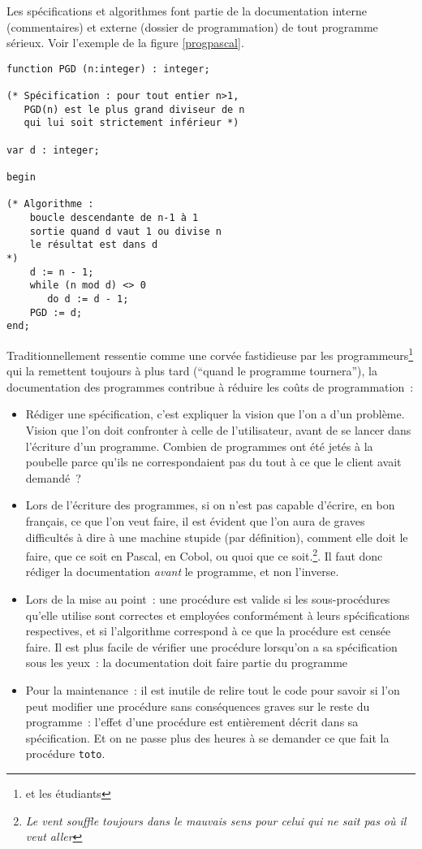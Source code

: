 Les spécifications et algorithmes font partie de la documentation
interne (commentaires) et externe (dossier de programmation) de tout
programme sérieux.  Voir l'exemple de la figure \ref{progpascal}.

\begin{figure*}[htb]
\barre
\begin{verbatim}
function PGD (n:integer) : integer;

(* Spécification : pour tout entier n>1,  
   PGD(n) est le plus grand diviseur de n 
   qui lui soit strictement inférieur *)

var d : integer; 

begin

(* Algorithme :
    boucle descendante de n-1 à 1
    sortie quand d vaut 1 ou divise n
    le résultat est dans d
*) 
    d := n - 1;
    while (n mod d) <> 0 
       do d := d - 1; 
    PGD := d;
end;
\end{verbatim}
\caption{Un programme Pascal bien documenté}
\label{progpascal}
\barre
\end{figure*}

 Traditionnellement ressentie comme une corvée
fastidieuse par les programmeurs\footnote{et les étudiants} qui la
remettent toujours à plus tard (``quand le programme tournera''), la
documentation des programmes contribue à réduire les coûts de
programmation~:
\begin{itemize}
\item Rédiger une spécification, c'est expliquer la vision que 
l'on a d'un problème. Vision que l'on doit confronter à celle de
l'utilisateur, avant de se lancer dans l'écriture d'un
programme. Combien de programmes ont été jetés à la poubelle parce
qu'ils ne correspondaient pas du tout à ce que le client avait
demandé~?
\item Lors de l'écriture des programmes, si on n'est pas capable
d'écrire, en bon français, ce que l'on veut faire, il est évident
que l'on aura de graves difficultés à dire à une machine stupide (par
définition), comment elle doit le faire, que ce soit en Pascal, en
Cobol, ou quoi que ce soit.\footnote{\em Le vent souffle toujours dans
le mauvais sens pour celui qui ne sait pas où il veut aller}. Il
faut donc rédiger la documentation \emph{avant} le programme, et non
l'inverse.
\item Lors de la mise au point~: une procédure est valide si 
les sous-procédures qu'elle utilise sont correctes et employées
conformément à leurs spécifications respectives, et si l'algorithme
correspond à ce que la procédure est censée faire. Il est plus facile
de vérifier une procédure lorsqu'on a sa spécification sous les yeux~:
la documentation doit faire partie du programme
\item Pour la maintenance~: il est inutile de relire tout le code 
pour savoir si l'on peut modifier une procédure sans conséquences
graves sur le reste du programme~: l'effet d'une procédure est
entièrement décrit dans sa spécification. Et on ne passe plus des
heures à se demander ce que fait la procédure \texttt{toto}.
\end{itemize}


